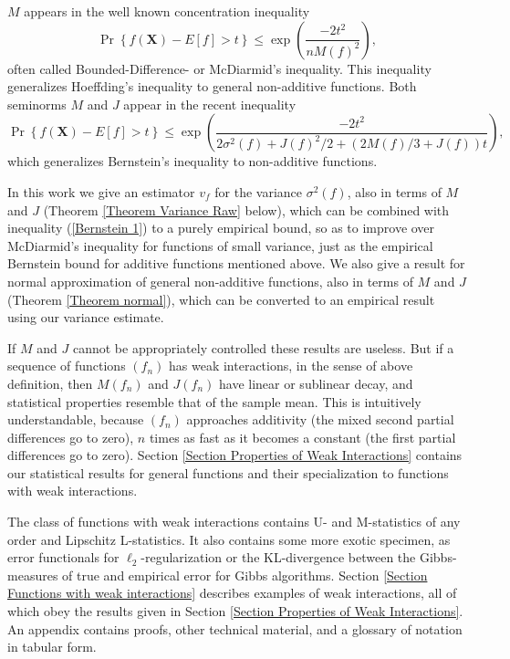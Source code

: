 \documentclass[final,12pt]{colt2018} %
\begin{document}
		$M$ appears in the well known concentration inequality \citep{McDiarmid 1998,Boucheron13}
		\begin{equation}
		\Pr \left\{ f\left( \mathbf{X}\right) -E\left[ f\right] >t\right\} \leq \exp
		\left( \frac{-2t^{2}}{nM\left( f\right) ^{2}}\right) ,
		\label{McDiarmids inequality}
		\end{equation}%
		often called Bounded-Difference- or McDiarmid's inequality. This inequality
		generalizes Hoeffding's inequality to general non-additive functions. Both
		seminorms $M$ and $J$ appear in the recent inequality \citep{Maurer 2017}%
		\begin{equation}
		\Pr \left\{ f\left( \mathbf{X}\right) -E\left[ f\right] >t\right\} \leq \exp
		\left( \frac{-2t^{2}}{2\sigma ^{2}\left( f\right) +J\left( f\right)
			^{2}/2+\left( 2M\left( f\right) /3+J\left( f\right) \right) t}\right) ,
		\label{Bernstein 1}
		\end{equation}%
		which generalizes Bernstein's inequality to non-additive functions.%
		
		In this work we give an estimator $v_{f}$ for the variance $\sigma
		^{2}\left( f\right) $, also in terms of $M$ and $J$ (Theorem \ref{Theorem
			Variance Raw} below), which can be combined with inequality (\ref{Bernstein
			1}) to a purely empirical bound, so as to improve over McDiarmid's
		inequality for functions of small variance, just as the empirical Bernstein
		bound for additive functions mentioned above. We also give a result for
		normal approximation of general non-additive functions, also in terms of $M$
		and $J$ (Theorem \ref{Theorem normal}), which can be converted to an
		empirical result using our variance estimate.
		
		If $M$ and $J$ cannot be appropriately controlled these results are useless.
		But if a sequence of functions $\left( f_{n}\right) $ has weak interactions,
		in the sense of above definition, then $M\left( f_{n}\right) $ and $J\left(
		f_{n}\right) $ have linear or sublinear decay, and statistical properties
		resemble that of the sample mean. This is intuitively understandable,
		because $\left( f_{n}\right) $ approaches additivity (the mixed second
		partial differences go to zero), $n$ times as fast as it becomes a constant
		(the first partial differences go to zero). Section \ref{Section Properties
			of Weak Interactions} contains our statistical results for general functions
		and their specialization to functions with weak interactions.%
		
		The class of functions with weak interactions contains U- and M-statistics
		of any order and Lipschitz L-statistics. It also contains some more exotic
		specimen, as error functionals for $\ell _{2}$-regularization or the
		KL-divergence between the Gibbs-measures of true and empirical error for
		Gibbs algorithms. Section \ref{Section Functions with weak interactions}
		describes examples of weak interactions, all of which obey the results given
		in Section \ref{Section Properties of Weak Interactions}. An appendix
		contains proofs, other technical material, and a glossary of notation in
		tabular form.
		
\end{document}
